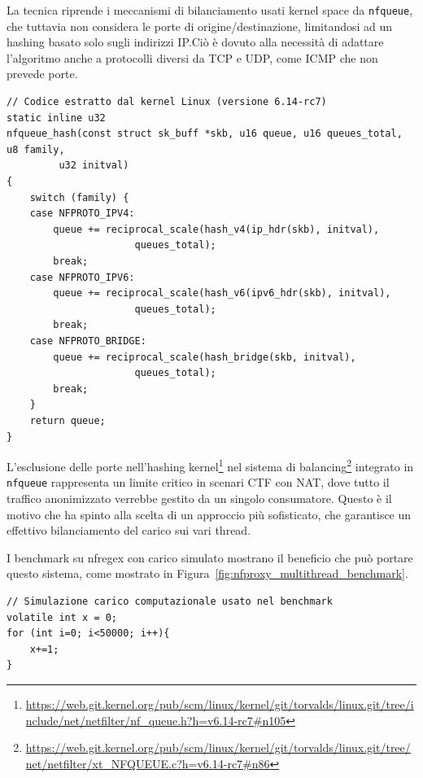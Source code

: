 La tecnica riprende i meccanismi di bilanciamento usati kernel space da \texttt{nfqueue}, che tuttavia non considera le porte di origine/destinazione,
limitandosi ad un hashing basato solo sugli indirizzi IP.\@ Ciò è dovuto alla necessità di adattare l'algoritmo anche a protocolli diversi da TCP e UDP, come ICMP che non prevede porte.

\begin{listing}[H]
\begin{verbatim}
// Codice estratto dal kernel Linux (versione 6.14-rc7)
static inline u32
nfqueue_hash(const struct sk_buff *skb, u16 queue, u16 queues_total, u8 family,
	     u32 initval)
{
	switch (family) {
	case NFPROTO_IPV4:
		queue += reciprocal_scale(hash_v4(ip_hdr(skb), initval),
					  queues_total);
		break;
	case NFPROTO_IPV6:
		queue += reciprocal_scale(hash_v6(ipv6_hdr(skb), initval),
					  queues_total);
		break;
	case NFPROTO_BRIDGE:
		queue += reciprocal_scale(hash_bridge(skb, initval),
					  queues_total);
		break;
	}
	return queue;
}
\end{verbatim}
\end{listing}

L'esclusione delle porte nell'hashing kernel\footnote{\url{https://web.git.kernel.org/pub/scm/linux/kernel/git/torvalds/linux.git/tree/include/net/netfilter/nf_queue.h?h=v6.14-rc7\#n105}}
nel sistema di balancing\footnote{\url{https://web.git.kernel.org/pub/scm/linux/kernel/git/torvalds/linux.git/tree/net/netfilter/xt_NFQUEUE.c?h=v6.14-rc7\#n86}} integrato in \texttt{nfqueue}
rappresenta un limite critico in scenari CTF con NAT, dove tutto il traffico anonimizzato verrebbe gestito da un singolo consumatore.
Questo è il motivo che ha spinto alla scelta di un approccio più sofisticato, che garantisce un effettivo bilanciamento del carico sui vari thread.

I benchmark su nfregex con carico simulato mostrano il beneficio che può portare questo sistema, come mostrato in Figura~\ref{fig:nfproxy_multithread_benchmark}.

\begin{listing}[H]
\begin{verbatim}
// Simulazione carico computazionale usato nel benchmark
volatile int x = 0;
for (int i=0; i<50000; i++){
    x+=1;
}
\end{verbatim}
\end{listing}

